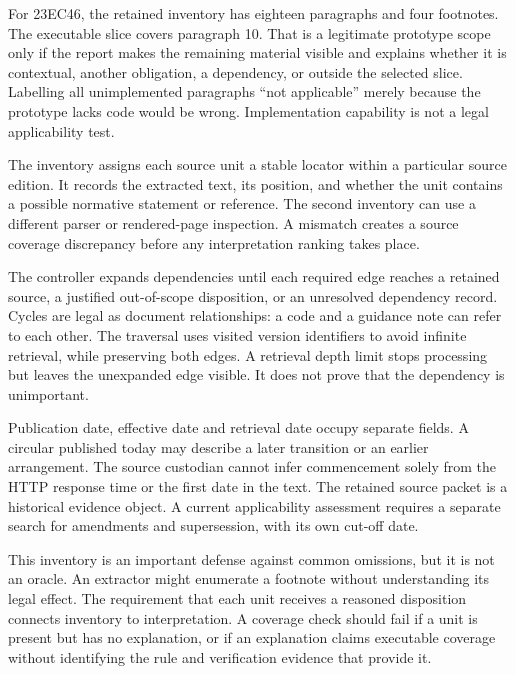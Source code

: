 For 23EC46, the retained inventory has eighteen paragraphs and four footnotes.
The executable slice covers paragraph 10. That is a legitimate prototype scope
only if the report makes the remaining material visible and explains whether it
is contextual, another obligation, a dependency, or outside the selected slice.
Labelling all unimplemented paragraphs ``not applicable'' merely because the
prototype lacks code would be wrong. Implementation capability is not a legal
applicability test.

The inventory assigns each source unit a stable locator within a particular
source edition. It records the extracted text, its position, and whether the unit
contains a possible normative statement or reference. The second inventory can
use a different parser or rendered-page inspection. A mismatch creates a source
coverage discrepancy before any interpretation ranking takes place.


The controller expands dependencies until each required edge reaches a retained
source, a justified out-of-scope disposition, or an unresolved dependency record.
Cycles are legal as document relationships: a code and a guidance note can refer
to each other. The traversal uses visited version identifiers to avoid infinite
retrieval, while preserving both edges. A retrieval depth limit stops processing
but leaves the unexpanded edge visible. It does not prove that the dependency is
unimportant.

Publication date, effective date and retrieval date occupy separate fields. A
circular published today may describe a later transition or an earlier
arrangement. The source custodian cannot infer commencement solely from the HTTP
response time or the first date in the text. The retained source packet is a
historical evidence object. A current applicability assessment requires a
separate search for amendments and supersession, with its own cut-off date.

This inventory is an important defense against common omissions, but it is not
an oracle. An extractor might enumerate a footnote without understanding its
legal effect. The requirement that each unit receives a reasoned disposition
connects inventory to interpretation. A coverage check should fail if a unit is
present but has no explanation, or if an explanation claims executable coverage
without identifying the rule and verification evidence that provide it.

